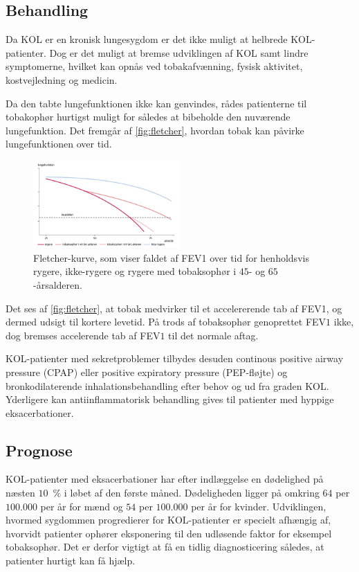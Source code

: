 \subsection{Behandling} \label{sec:behandling}
Da KOL er en kronisk lungesygdom er det ikke muligt at helbrede KOL-patienter. Dog er det muligt at bremse udviklingen af KOL samt lindre symptomerne, hvilket kan opnås ved tobakafvænning, fysisk aktivitet, kostvejledning og medicin. 

Da den tabte lungefunktionen ikke kan genvindes, rådes patienterne til tobakophør hurtigst muligt for således at bibeholde den nuværende lungefunktion. Det fremgår af \autoref{fig:fletcher}, hvordan tobak kan påvirke lungefunktionen over tid. 

\begin{figure} [H]
\centering
\includegraphics[width=0.5\textwidth]{figures/fletcher}
\caption{Fletcher-kurve, som viser faldet af FEV1 over tid for henholdsvis rygere, ikke-rygere og rygere med tobaksophør i $45$- og $65$-årsalderen.\cite{dsam2016}}
\label{fig:fletcher}
\end{figure} 

\noindent
Det ses af \autoref{fig:fletcher}, at tobak medvirker til et accelererende tab af FEV1, og dermed udsigt til kortere levetid. På trods af tobaksophør genoprettet FEV$1$ ikke, dog bremses accelerende tab af FEV$1$ til det normale aftag.\cite{dsam2016}

KOL-patienter med sekretproblemer tilbydes desuden continous positive airway pressure (CPAP) eller positive expiratory pressure (PEP-fløjte) og bronkodilaterende inhalationsbehandling efter behov og ud fra graden KOL. Yderligere kan antiinflammatorisk behandling gives til patienter med hyppige eksacerbationer. \cite{Basisbogen2016}
 
\subsection{Prognose}
KOL-patienter med eksacerbationer har efter indlæggelse en dødelighed på næsten $10$~$\%$ i løbet af den første måned. Dødeligheden ligger på omkring $64$ per $100.000$ per år for mænd og $54$ per $100.000$ per år for kvinder.
Udviklingen, hvormed sygdommen progredierer for KOL-patienter er specielt afhængig af, hvorvidt patienter ophører eksponering til den udløsende faktor for eksempel tobaksophør. Det er derfor vigtigt at få en tidlig diagnosticering således, at patienter hurtigt kan få hjælp. \cite{dsam2016}

